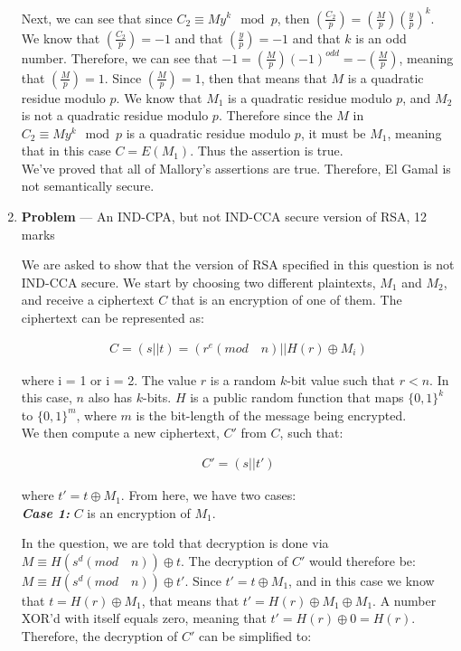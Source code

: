 \documentclass[11pt]{article}
\theoremstyle{definition}
\newcounter{problem}
\providecommand{\Leg}[2]{\genfrac{(}{)}{}{}{#1}{#2}}
\begin{document}
\begin{enumerate}
Next, we can see that since $C_2 \equiv My^k \mod{p}$, then $\Leg{C_2}{p} = \Leg{M}{p} \Leg{y}{p}^k$. We know that $\Leg{C_2}{p} = -1$ and that $\Leg{y}{p} = -1$ and that $k$ is an odd number. Therefore, we can see that $-1 = \Leg{M}{p} (-1)^{odd} = -\Leg{M}{p}$, meaning that $\Leg{M}{p} = 1$. Since $\Leg{M}{p} = 1$, then that means that $M$ is a quadratic residue modulo $p$. We know that $M_1$ is a quadratic residue modulo $p$, and $M_2$ is not a quadratic residue modulo $p$. Therefore since the $M$ in $C_2 \equiv My^k \mod{p}$ is a quadratic residue modulo $p$, it must be $M_1$, meaning that in this case $C = E(M_1)$. Thus the assertion is true. \\

We've proved that all of Mallory's assertions are true. Therefore, El Gamal is not semantically secure.

\newpage


\item[] \textbf{Problem \theproblem} --- An IND-CPA, but not IND-CCA secure version of RSA, 12
    marks
    
    We are asked to show that the version of RSA specified in this question is not IND-CCA secure. We start by choosing two different plaintexts, $M_1$ and $M_2$, and receive a ciphertext $C$ that is an encryption of one of them. The ciphertext can be represented as:
    
    \begin{align*}
        C = (s||t) = (r^e (mod \quad n) || H(r) \oplus M_i)
    \end{align*}
    
    where i = 1 or i = 2. The value $r$ is a random $k$-bit value such that $r < n$. In this case, $n$ also has $k$-bits. $H$ is a public random function that maps $\{0, 1\}^k$ to $\{0, 1\}^m$, where $m$ is the bit-length of the message being encrypted. \\
    
    We then compute a new ciphertext, $C'$ from $C$, such that:
    
    \begin{align*}
        C' = (s||t')
    \end{align*}
    
    where $t' = t \oplus M_1$. From here, we have two cases: \\
    
    \textbf{\textit{Case 1:}} $C$ is an encryption of $M_1$.
    
    In the question, we are told that decryption is done via $M \equiv H(s^d (mod \quad n)) \oplus t$. The decryption of $C'$ would therefore be: $M \equiv H(s^d (mod \quad n)) \oplus t'$. Since $t' = t \oplus M_1$, and in this case we know that $t = H(r) \oplus M_1$, that means that $t' = H(r) \oplus M_1 \oplus M_1$. A number XOR'd with itself equals zero, meaning that $t' = H(r) \oplus 0 = H(r)$. Therefore, the decryption of $C'$ can be simplified to: 
    

\end{enumerate}
\end{document}
